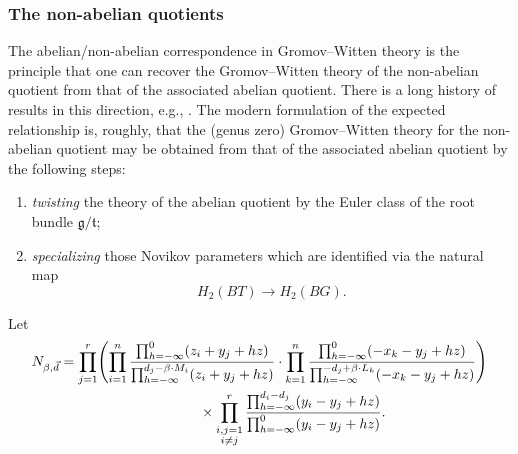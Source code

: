 \documentclass[11pt]{article}
\numberwithin{equation}{section}
\numberwithin{equation}{section}
\newcommand{\MB}{M}
\newcommand{\LB}{L}
\newcommand{\z}{z}
\newcommand{\x}{x}
\newcommand{\y}{y}
\begin{document}
\subsubsection{The non-abelian quotients}
The abelian/non-abelian correspondence in Gromov--Witten theory is the principle that one can recover the Gromov--Witten theory of the non-abelian quotient from that of the associated abelian quotient. There is a long history of results in this direction, e.g., \cite{BCK, BCK2, CKS, CLS, Web, Web2}. The modern formulation of the expected relationship is, roughly, that the (genus zero) Gromov--Witten theory for the non-abelian quotient may be obtained from that of the associated abelian quotient by the following steps:
\begin{enumerate}\itemsep=0pt
\item[1)] \emph{twisting} the theory of the abelian quotient by the Euler class of the root bundle $\mathfrak g/\mathfrak t$;
\item[2)] \emph{specializing} those Novikov parameters which are identified via the natural map
\[
H_2(BT) \to H_2(BG).
\]
\end{enumerate}
Let
\begin{gather}%
 N_{\beta,\vec{d}}=
	 \prod_{j=1}^r\Biggl(\prod_{i=1}^n \frac{\prod_{h=-\infty}^0 (\z_i+\y_j+hz)}{\prod_{h=-\infty}^{d_j-\beta\cdot \MB_i} (\z_i+\y_j+hz)}
	\cdot \prod_{k=1}^{n}\frac{\prod_{h=-\infty}^{0}(-\x_k -\y_j+hz)}{\prod_{h=-\infty}^{-d_j+\beta\cdot \LB_k}(-\x_k -\y_j+hz)}\Biggr) \nonumber \\
	\hphantom{ N_{\beta,\vec{d}}=\prod_{j=1}^r}{}
 \times \prod_{\substack{i,j=1\\ i\neq j}}^r
	\frac{\prod_{h=-\infty}^{d_i-d_j}(\y_i-\y_j+hz)}{\prod_{h=-\infty}^{0}(\y_i-\y_j+hz)} .\label{Nbeta}
	\end{gather}
\end{document}
